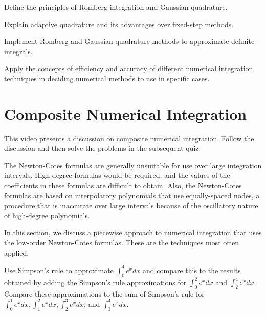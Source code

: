 \begin{mlos}
\item Define the principles of Romberg integration and Gaussian quadrature.
\item Explain adaptive quadrature and its advantages over fixed-step methods.
\item Implement Romberg and Gaussian quadrature methods to approximate definite integrals.
\item Apply the concepts of efficiency and accuracy of different numerical integration techniques in deciding numerical methods to use in specific cases.
\end{mlos}

\section{Composite Numerical Integration}
\videolesson
\begin{selfvideo}[1]
This video presents a discussion on composite numerical integration. Follow the discussion and then solve the problems in the subsequent quiz.
\end{selfvideo}
The Newton-Cotes formulas are generally unsuitable for use over large integration intervals. High-degree formulas would be required, and the values of the coefficients in these formulas are difficult to obtain. Also, the Newton-Cotes formulas are based on interpolatory polynomials that use equally-spaced nodes, a procedure that is inaccurate over large intervals because of the oscillatory nature of high-degree polynomials.

In this section, we discuss a piecewise approach to numerical integration that uses the low-order Newton-Cotes formulas. These are the techniques most often applied.

\begin{example}
Use Simpson's rule to approximate $\int_{0}^{4} e^{x} d x$ and compare this to the results obtained by adding the Simpson's rule approximations for $\int_{0}^{2} e^{x} d x$ and $\int_{2}^{4} e^{x} d x$. Compare these approximations to the sum of Simpson's rule for $\int_{0}^{1} e^{x} d x, \int_{1}^{2} e^{x} d x, \int_{2}^{3} e^{x} d x$, and $\int_{3}^{4} e^{x} d x$.
\end{example}

